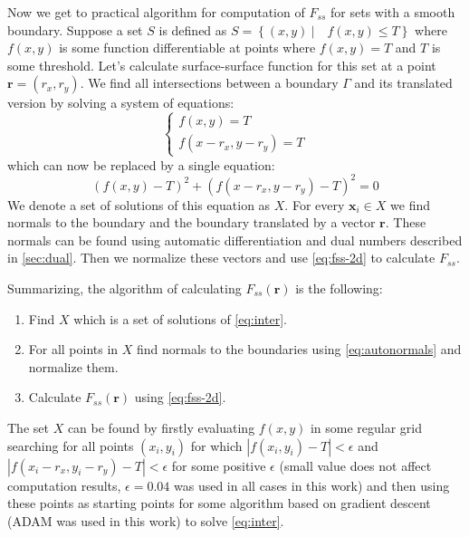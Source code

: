 \documentclass[preprint]{elsarticle}
\begin{document}
Now we get to practical algorithm for computation of $F_{ss}$ for sets with a
smooth boundary. Suppose a set $S$ is defined as
$S = \left\{ (x, y) \ | \quad f(x, y) \le T \right\}$ where $f(x, y)$ is some
function differentiable at points where $f(x, y) = T$ and $T$ is some
threshold. Let's calculate surface-surface function for this set at a point
$\bm{r} = (r_x, r_y)$. We find all intersections between a boundary $\Gamma$ and
its translated version by solving a system of equations:
\begin{equation}
  \left\{
  \begin{array}{l}
    f(x, y) = T \\
    f(x-r_x, y-r_y) = T
  \end{array}
  \right.
\end{equation}
which can now be replaced by a single equation:
\begin{equation}
  (f(x, y) - T)^2 + (f(x-r_x, y-r_y) - T)^2 = 0 \label{eq:inter}
\end{equation}
We denote a set of solutions of this equation as $X$. For every $\bm{x}_i \in X$
we find normals to the boundary and the boundary translated by a vector
$\bm{r}$. These normals can be found using automatic differentiation and dual
numbers described in \ref{sec:dual}. Then we normalize these vectors and use
\cref{eq:fss-2d} to calculate $F_{ss}$.

Summarizing, the algorithm of calculating $F_{ss}(\bm{r})$ is the following:
\begin{enumerate}
\item Find $X$ which is a set of solutions of \cref{eq:inter}.
\item For all points in $X$ find normals to the boundaries using
  \cref{eq:autonormals} and normalize them.
\item Calculate $F_{ss}(\bm{r})$ using \cref{eq:fss-2d}.
\end{enumerate}

The set $X$ can be found by firstly evaluating $f(x, y)$ in some regular grid
searching for all points $(x_i, y_i)$ for which $|f(x_i, y_i) - T| < \epsilon$
and $|f(x_i - r_x, y_i - r_y) - T| < \epsilon$ for some positive $\epsilon$ 
(small value does not affect computation results, $\epsilon=0.04$ was used in
all cases in this work) and then using these points as starting points for some
algorithm based on gradient descent (ADAM \cite{adam} was used in this work) to
solve \cref{eq:inter}.
\end{document}
